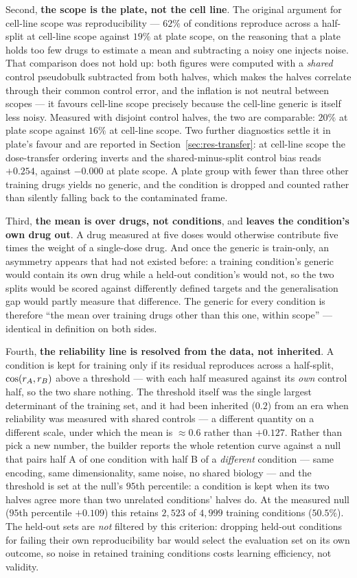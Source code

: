 Second, \textbf{the scope is the plate, not the cell line}. The original argument for cell-line
scope was reproducibility --- $62\%$ of conditions reproduce across a half-split at cell-line scope
against $19\%$ at plate scope, on the reasoning that a plate holds too few drugs to estimate a mean
and subtracting a noisy one injects noise. That comparison does not hold up: both figures were
computed with a \emph{shared} control pseudobulk subtracted from both halves, which makes the halves
correlate through their common control error, and the inflation is not neutral between scopes ---
it favours cell-line scope precisely because the cell-line generic is itself less noisy. Measured
with disjoint control halves, the two are comparable: $20\%$ at plate scope against $16\%$ at
cell-line scope. Two further diagnostics settle it in plate's favour and are reported in
Section~\ref{sec:res-transfer}: at cell-line scope the dose-transfer ordering inverts and the
shared-minus-split control bias reads $+0.254$, against $-0.000$ at plate scope. A plate group with
fewer than three other training drugs yields no generic, and the condition is dropped and counted
rather than silently falling back to the contaminated frame.

Third, \textbf{the mean is over drugs, not conditions}, and \textbf{leaves the condition's own drug
out}. A drug measured at five doses would otherwise contribute five times the weight of a
single-dose drug. And once the generic is train-only, an asymmetry appears that had not existed
before: a training condition's generic would contain its own drug while a held-out condition's would
not, so the two splits would be scored against differently defined targets and the generalisation
gap would partly measure that difference. The generic for every condition is therefore ``the mean
over training drugs other than this one, within scope'' --- identical in definition on both sides.

Fourth, \textbf{the reliability line is resolved from the data, not inherited}. A condition is kept
for training only if its residual reproduces across a half-split, $\cos(r_A, r_B)$ above
a threshold --- with each half measured against its \emph{own} control half, so the two share
nothing. The threshold itself was the single largest determinant of the training set, and it had
been inherited ($0.2$) from an era when reliability was measured with shared controls --- a
different quantity on a different scale, under which the mean is $\approx 0.6$ rather than
$+0.127$. Rather than pick a new number, the builder reports the whole retention curve against a
null that pairs half A of one condition with half B of a \emph{different} condition --- same
encoding, same dimensionality, same noise, no shared biology --- and the threshold is set at the
null's $95$th percentile: a condition is kept when its two halves agree more than two unrelated
conditions' halves do. At the measured null ($95$th percentile $+0.109$) this retains $2{,}523$ of
$4{,}999$ training conditions ($50.5\%$). The held-out sets are \emph{not} filtered by this
criterion: dropping held-out conditions for failing their own reproducibility bar would select the
evaluation set on its own outcome, so noise in retained training conditions costs learning
efficiency, not validity.

